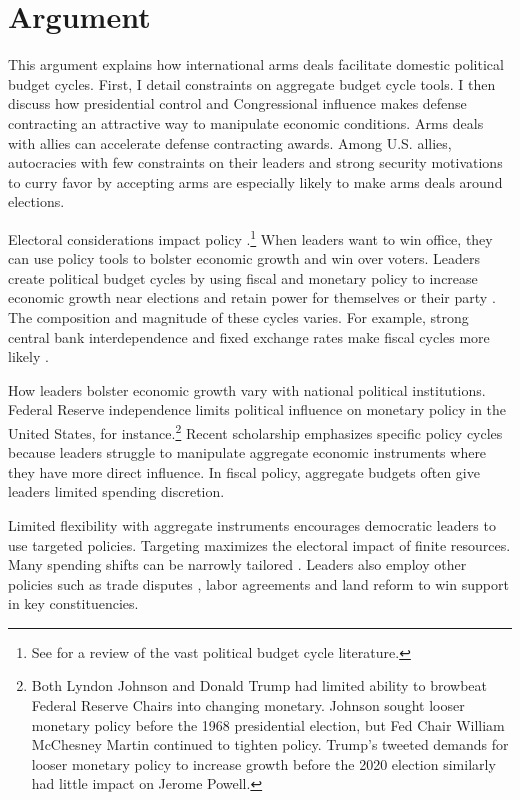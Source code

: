 \documentclass[12pt]{article}
\begin{document}
\section{Argument}


This argument explains how international arms deals facilitate domestic political budget cycles.
First, I detail constraints on aggregate budget cycle tools.
I then discuss how presidential control and Congressional influence makes defense contracting an attractive way to manipulate economic conditions. 
Arms deals with allies can accelerate defense contracting awards. 
Among U.S. allies, autocracies with few constraints on their leaders and strong security motivations to curry favor by accepting arms are especially likely to make arms deals around elections.


Electoral considerations impact policy \citep{Nordhaus1975}.\footnote{See \citet{Dubois2016} for a review of the vast political budget cycle literature.} 
When leaders want to win office, they can use policy tools to bolster economic growth and win over voters. 
Leaders create political budget cycles by using fiscal and monetary policy to increase economic growth near elections and retain power for themselves or their party \citep{Tufte1978, Rogoff1987}. 
The composition and magnitude of these cycles varies. 
For example, strong central bank interdependence and fixed exchange rates make fiscal cycles more likely \citep{ClarkHallerberg2000}. 


How leaders bolster economic growth vary with national political institutions. 
Federal Reserve independence limits political influence on monetary policy in the United States, for instance.\footnote{Both Lyndon Johnson and Donald Trump had limited ability to browbeat Federal Reserve Chairs into changing monetary. 
Johnson sought looser monetary policy before the 1968 presidential election, but Fed Chair William McChesney Martin continued to tighten policy.
Trump's tweeted demands for looser monetary policy to increase growth before the 2020 election similarly had little impact on Jerome Powell.}
Recent scholarship emphasizes specific policy cycles because leaders struggle to manipulate aggregate economic instruments where they have more direct influence. 
In fiscal policy, aggregate budgets often give leaders limited spending discretion.


Limited flexibility with aggregate instruments encourages democratic leaders to use targeted policies.
Targeting maximizes the electoral impact of finite resources.
Many spending shifts can be narrowly tailored \citep[pg. 248]{Dubois2016}.
Leaders also employ other policies such as trade disputes \citep{Conconietal2017}, labor agreements \citep{Ahlquist2010} and land reform \citep{Philips2020} to win support in key constituencies.
\end{document}
